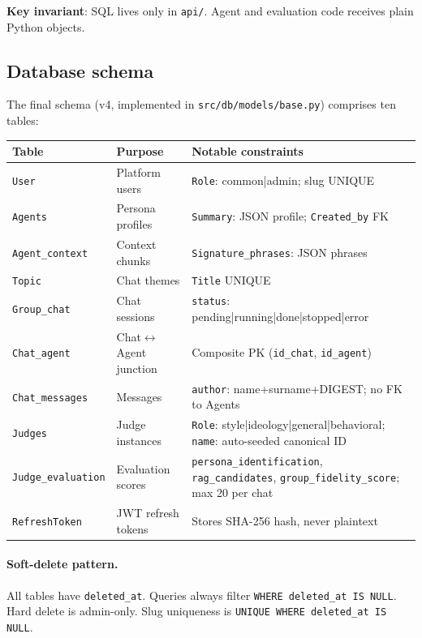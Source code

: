 \documentclass[12pt,a4paper]{article}
\begin{document}
\textbf{Key invariant}: SQL lives only in \texttt{api/}. Agent and evaluation code receives
plain Python objects.

\subsection{Database schema}

The final schema (v4, implemented in \texttt{src/db/models/base.py}) comprises ten tables:

{\small\setlength\tabcolsep{3pt}
\begin{longtable}{@{}p{3.5cm}p{3cm}p{10cm}@{}}
\toprule
\textbf{Table} & \textbf{Purpose} & \textbf{Notable constraints} \\
\midrule
\texttt{User} & Platform users & \texttt{Role}: common|admin; slug UNIQUE \\
\texttt{Agents} & Persona profiles & \texttt{Summary}: JSON profile; \texttt{Created\_by} FK \\
\texttt{Agent\_context} & Context chunks & \texttt{Signature\_phrases}: JSON phrases \\
\texttt{Topic} & Chat themes & \texttt{Title} UNIQUE \\
\texttt{Group\_chat} & Chat sessions & \texttt{status}: pending|running|done|stopped|error \\
\texttt{Chat\_agent} & Chat$\leftrightarrow$Agent junction & Composite PK (\texttt{id\_chat}, \texttt{id\_agent}) \\
\texttt{Chat\_messages} & Messages & \texttt{author}: name+surname+DIGEST; no FK to Agents \\
\texttt{Judges} & Judge instances & \texttt{Role}: style|ideology|general|behavioral; \texttt{name}: auto-seeded canonical ID \\
\texttt{Judge\_evaluation} & Evaluation scores & \texttt{persona\_identification}, \texttt{rag\_candidates}, \texttt{group\_fidelity\_score}; max 20 per chat \\
\texttt{RefreshToken} & JWT refresh tokens & Stores SHA-256 hash, never plaintext \\
\bottomrule
\end{longtable}
}

\paragraph{Soft-delete pattern.}
All tables have \texttt{deleted\_at}. Queries always filter \texttt{WHERE deleted\_at IS NULL}.
Hard delete is admin-only. Slug uniqueness is \texttt{UNIQUE WHERE deleted\_at IS NULL}.
\end{document}
